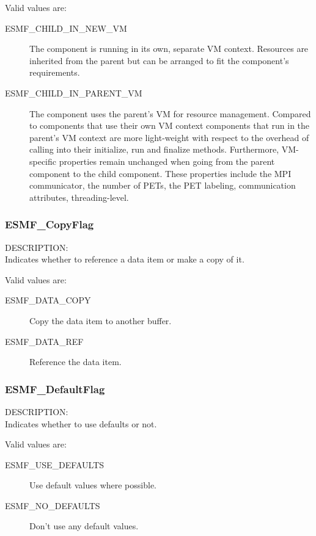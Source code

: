 Valid values are:
\begin{description}

\item [ESMF\_CHILD\_IN\_NEW\_VM]
         The component is running in its own, separate VM context. Resources
         are inherited from the parent but can be arranged to fit the
         component's requirements.
\item [ESMF\_CHILD\_IN\_PARENT\_VM]
         The component uses the parent's VM for resource management. Compared
         to components that use their own VM context components that run in the
         parent's VM context are more light-weight with respect to the overhead
         of calling into their initialize, run and finalize methods.
         Furthermore, VM-specific properties remain unchanged when going from
         the parent component to the child component. These properties include
         the MPI communicator, the number of PETs, the PET labeling, 
         communication attributes, threading-level.

\end{description}

\subsubsection{ESMF\_CopyFlag}
\label{opt:copyflag}
{\sf DESCRIPTION:\\}
Indicates whether to reference a data item or make a copy of it.

Valid values are:
\begin{description}
\item [ESMF\_DATA\_COPY]
      Copy the data item to another buffer.
\item [ESMF\_DATA\_REF]
      Reference the data item.
\end{description}

\subsubsection{ESMF\_DefaultFlag}
\label{opt:defaultflag}
{\sf DESCRIPTION:\\}
Indicates whether to use defaults or not.

Valid values are:
\begin{description}
\item [ESMF\_USE\_DEFAULTS]
      Use default values where possible.
\item [ESMF\_NO\_DEFAULTS]
      Don't use any default values.
\end{description}

